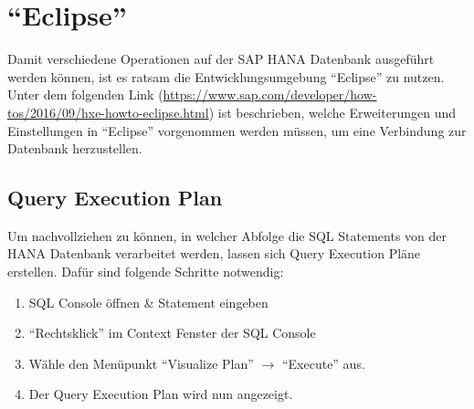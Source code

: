 \chapter{\enquote{Eclipse}}
Damit verschiedene Operationen auf der SAP HANA Datenbank ausgeführt werden können, ist es ratsam die Entwicklungsumgebung \enquote{Eclipse} zu nutzen. \\Unter dem folgenden Link (\url{https://www.sap.com/developer/how-tos/2016/09/hxe-howto-eclipse.html}) ist beschrieben, welche Erweiterungen und Einstellungen in \enquote{Eclipse} vorgenommen werden müssen, um eine Verbindung zur Datenbank herzustellen.

\section{Query Execution Plan}
Um nachvollziehen zu können, in welcher Abfolge die SQL Statements von der HANA Datenbank verarbeitet werden, lassen sich Query Execution Pläne erstellen.
Dafür sind folgende Schritte notwendig:
\begin{enumerate}
	\item SQL Console öffnen \& Statement eingeben
	\item \enquote{Rechtsklick} im Context Fenster der SQL Console
	\item Wähle den Menüpunkt \enquote{Visualize Plan} $\rightarrow$ \enquote{Execute} aus.
	\item Der Query Execution Plan wird nun angezeigt.
\end{enumerate} 
